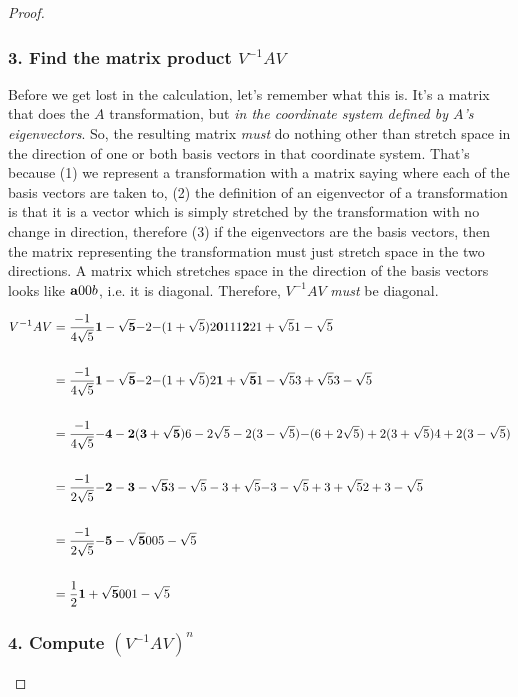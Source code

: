 \begin{proof}
\subsubsection{3. Find the matrix product $V^{-1}AV$}

Before we get lost in the calculation, let's remember what this is. It's a
matrix that does the $A$ transformation, but \textit{in the coordinate system defined
by $A$'s eigenvectors}. So, the resulting matrix \textit{must} do nothing other than
stretch space in the direction of one or both basis vectors in that coordinate
system. That's because (1) we represent a transformation with a matrix saying
where each of the basis vectors are taken to, (2) the definition of an
eigenvector of a transformation is that it is a vector which is simply
stretched by the transformation with no change in direction, therefore (3) if
the eigenvectors are the basis vectors, then the matrix representing the
transformation must just stretch space in the two directions. A matrix which
stretches space in the direction of the basis vectors looks like
$\tiny{\mathbf{a}{0}{0}{b}}$, i.e. it is diagonal. Therefore, $V^{-1}AV$ \textit{must} be
diagonal.

\begin{align*}
V^{-1}AV &=
\frac{-1}{4\sqrt 5}
\mathbf{1 - \sqrt 5 }{-2}
    {-(1 + \sqrt 5)}{2}
\mathbf{0}{1}
    {1}{1}
\mathbf{2          }{2          }
    {1 + \sqrt 5}{1 - \sqrt 5}
\\\\
&=
\frac{-1}{4\sqrt 5}
\mathbf{1 - \sqrt 5 }{-2}
    {-(1 + \sqrt 5)}{2}
\mathbf{1 + \sqrt 5}{1 - \sqrt 5}
    {3 + \sqrt 5}{3 - \sqrt 5}
\\\\
&=
\frac{-1}{4\sqrt 5}
\mathbf{-4 - 2(3 + \sqrt 5)             }{6 - 2\sqrt 5 - 2(3 - \sqrt 5)}
    {-(6 + 2\sqrt 5) + 2(3 + \sqrt 5)}{4 + 2(3 - \sqrt 5)}
\\\\
&=
\frac{-1}{2\sqrt 5}
\mathbf{-2 - 3 - \sqrt 5}{3 - \sqrt 5 - 3 + \sqrt 5}
    {-3 - \sqrt 5 + 3 + \sqrt 5}{2 + 3 - \sqrt 5}
\\\\
&=
\frac{-1}{2\sqrt 5}
\mathbf{-5 - \sqrt 5}{0          }
    {0           }{5 - \sqrt 5}
\\\\
&=
\frac{1}{2}
\mathbf{1 + \sqrt 5}{0          }
    {0          }{1 - \sqrt 5}
\end{align*}

\subsubsection{4. Compute $(V^{-1}AV)^n$}


\end{proof}
